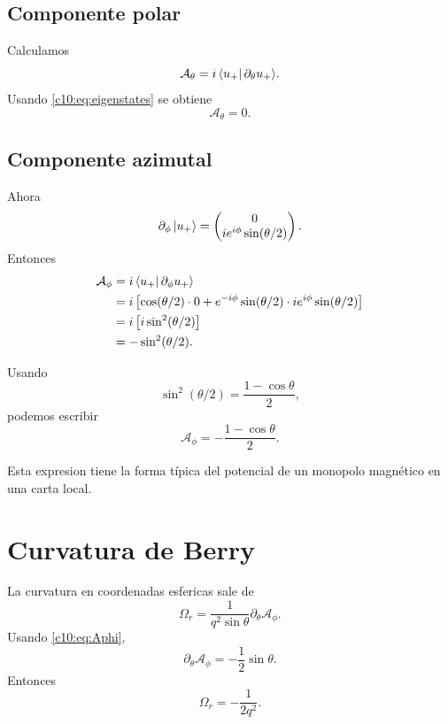 \subsection{Componente polar}
Calculamos
\begin{equation}
\mathcal{A}_\theta
=
i\bra{u_+}\partial_\theta u_+\rangle.
\end{equation}
Usando \eqref{c10:eq:eigenstates} se obtiene
\begin{equation}
\mathcal{A}_\theta=0.
\end{equation}

\subsection{Componente azimutal}
Ahora
\begin{equation}
\partial_\phi \ket{u_+}
=
\begin{pmatrix}
0\\
i e^{i\phi}\sin(\theta/2)
\end{pmatrix}.
\end{equation}
Entonces
\begin{align}
\mathcal{A}_\phi
&=
i\bra{u_+}\partial_\phi u_+\rangle
\\
&=
i\left[
\cos(\theta/2)\cdot 0
+
e^{-i\phi}\sin(\theta/2)\cdot i e^{i\phi}\sin(\theta/2)
\right]
\\
&=
i\left[i\sin^2(\theta/2)\right]
\\
&=
-\sin^2(\theta/2).
\end{align}

Usando
\begin{equation}
\sin^2(\theta/2)=\frac{1-\cos\theta}{2},
\end{equation}
podemos escribir
\begin{equation}
\mathcal{A}_\phi = -\frac{1-\cos\theta}{2}.
\label{c10:eq:Aphi}
\end{equation}

Esta expresion tiene la forma típica del potencial de un monopolo magnético en una carta local.

\section{Curvatura de Berry}
La curvatura en coordenadas esfericas sale de
\begin{equation}
\Omega_r
=
\frac{1}{q^2\sin\theta}
\partial_\theta \mathcal{A}_\phi.
\end{equation}
Usando \eqref{c10:eq:Aphi},
\begin{equation}
\partial_\theta \mathcal{A}_\phi
=
-\frac{1}{2}\sin\theta.
\end{equation}
Entonces
\begin{equation}
\Omega_r
=
-\frac{1}{2q^2}.
\end{equation}

